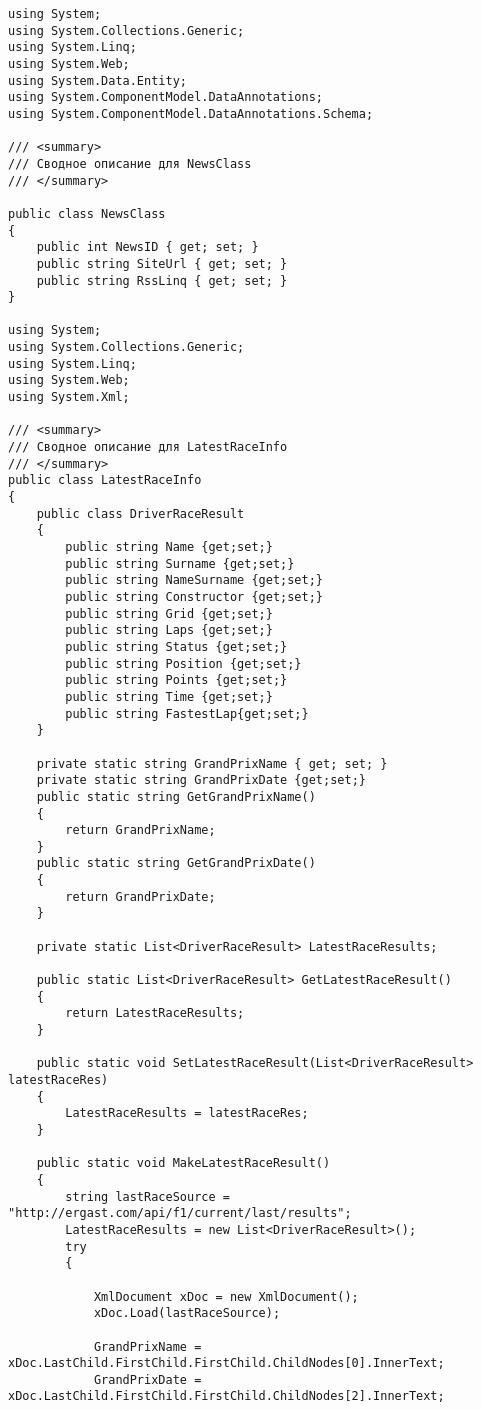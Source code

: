 \documentclass[14pt,a4paper]{extreport}
\begin{document}
\begin{landscape}
\begin{lstlisting}
using System;
using System.Collections.Generic;
using System.Linq;
using System.Web;
using System.Data.Entity;
using System.ComponentModel.DataAnnotations;
using System.ComponentModel.DataAnnotations.Schema;

/// <summary>
/// Сводное описание для NewsClass
/// </summary>

public class NewsClass
{
    public int NewsID { get; set; }
    public string SiteUrl { get; set; }
    public string RssLinq { get; set; }
}

using System;
using System.Collections.Generic;
using System.Linq;
using System.Web;
using System.Xml;

/// <summary>
/// Сводное описание для LatestRaceInfo
/// </summary>
public class LatestRaceInfo
{
    public class DriverRaceResult
    {
        public string Name {get;set;}
        public string Surname {get;set;}
        public string NameSurname {get;set;}
        public string Constructor {get;set;}
        public string Grid {get;set;}
        public string Laps {get;set;}
        public string Status {get;set;}
        public string Position {get;set;}
        public string Points {get;set;}
        public string Time {get;set;}
        public string FastestLap{get;set;}
    }

    private static string GrandPrixName { get; set; }
    private static string GrandPrixDate {get;set;}
    public static string GetGrandPrixName()
    {
        return GrandPrixName;
    }
    public static string GetGrandPrixDate()
    {
        return GrandPrixDate;
    }

    private static List<DriverRaceResult> LatestRaceResults;

    public static List<DriverRaceResult> GetLatestRaceResult()
    {
        return LatestRaceResults;
    }

    public static void SetLatestRaceResult(List<DriverRaceResult> latestRaceRes)
    {
        LatestRaceResults = latestRaceRes;
    }
	
    public static void MakeLatestRaceResult()
    {
        string lastRaceSource = "http://ergast.com/api/f1/current/last/results";
        LatestRaceResults = new List<DriverRaceResult>();
        try
        {

            XmlDocument xDoc = new XmlDocument();
            xDoc.Load(lastRaceSource);

            GrandPrixName = xDoc.LastChild.FirstChild.FirstChild.ChildNodes[0].InnerText;
            GrandPrixDate = xDoc.LastChild.FirstChild.FirstChild.ChildNodes[2].InnerText;


\end{lstlisting}
\end{landscape}
\end{document}
